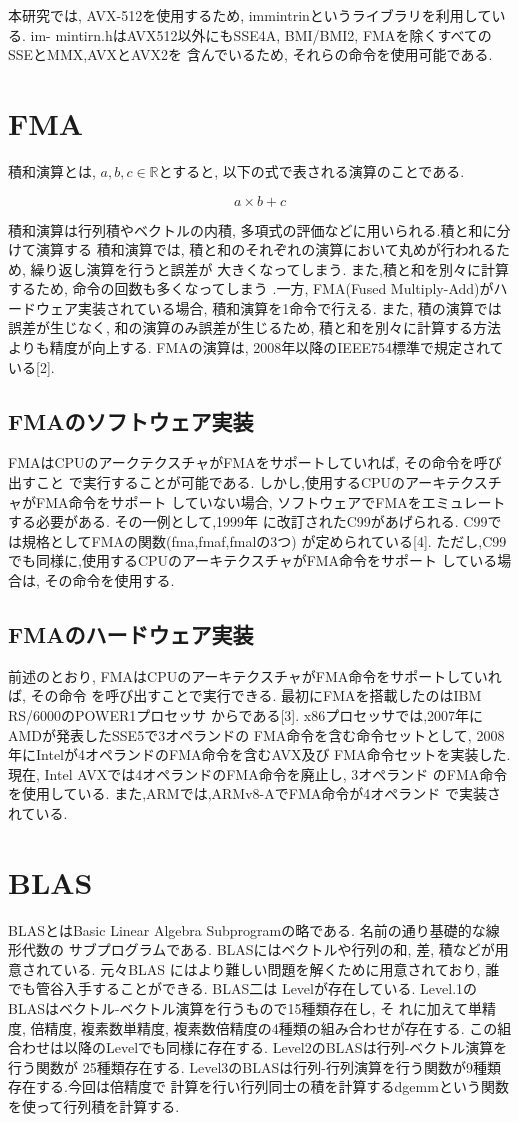 \documentclass[11pt,a4paper]{jsreport}
\theoremstyle{definition}
\begin{document}
  本研究では, AVX-512を使用するため, immintrinというライブラリを利用している. im-
mintirn.hはAVX512以外にもSSE4A, BMI/BMI2, FMAを除くすべてのSSEとMMX,AVXとAVX2を
含んでいるため, それらの命令を使用可能である.
\section{FMA}
  積和演算とは, $a,b,c \in \mathbb{R}$とすると, 以下の式で表される演算のことである.

  \begin{equation*}
  a \times b + c
  \end{equation*}

  積和演算は行列積やベクトルの内積, 多項式の評価などに用いられる.積と和に分けて演算する
積和演算では, 積と和のそれぞれの演算において丸めが行われるため, 繰り返し演算を行うと誤差が
大きくなってしまう. また,積と和を別々に計算するため, 命令の回数も多くなってしまう .一方, 
FMA(Fused Multiply-Add)がハードウェア実装されている場合, 積和演算を1命令で行える. 
また, 積の演算では誤差が生じなく, 和の演算のみ誤差が生じるため, 積と和を別々に計算する方法
よりも精度が向上する. FMAの演算は, 2008年以降のIEEE754標準で規定されている[2].
\subsection{FMAのソフトウェア実装}
  FMAはCPUのアークテクスチャがFMAをサポートしていれば, その命令を呼び出すこと
で実行することが可能である. しかし,使用するCPUのアーキテクスチャがFMA命令をサポート
していない場合, ソフトウェアでFMAをエミュレートする必要がある. その一例として,1999年
に改訂されたC99があげられる. C99では規格としてFMAの関数(fma,fmaf,fmalの3つ)
が定められている[4]. ただし,C99でも同様に,使用するCPUのアーキテクスチャがFMA命令をサポート
している場合は, その命令を使用する.
\subsection{FMAのハードウェア実装}
  前述のとおり, FMAはCPUのアーキテクスチャがFMA命令をサポートしていれば, その命令
を呼び出すことで実行できる. 最初にFMAを搭載したのはIBM RS/6000のPOWER1プロセッサ
からである[3]. x86プロセッサでは,2007年にAMDが発表したSSE5で3オペランドの
FMA命令を含む命令セットとして, 2008年にIntelが4オペランドのFMA命令を含むAVX及び
FMA命令セットを実装した. 現在, Intel AVXでは4オペランドのFMA命令を廃止し, 3オペランド
のFMA命令を使用している. また,ARMでは,ARMv8-AでFMA命令が4オペランド
で実装されている.
\section{BLAS}
  BLASとはBasic Linear Algebra Subprogramの略である. 名前の通り基礎的な線形代数の
サブプログラムである. BLASにはベクトルや行列の和, 差, 積などが用意されている. 元々BLAS
にはより難しい問題を解くために用意されており, 誰でも管谷入手することができる. BLAS二は
Levelが存在している. Level.1のBLASはベクトル-ベクトル演算を行うもので15種類存在し, そ
れに加えて単精度, 倍精度, 複素数単精度, 複素数倍精度の4種類の組み合わせが存在する. この組
合わせは以降のLevelでも同様に存在する. Level2のBLASは行列-ベクトル演算を行う関数が
25種類存在する. Level3のBLASは行列-行列演算を行う関数が9種類存在する.今回は倍精度で
計算を行い行列同士の積を計算するdgemmという関数を使って行列積を計算する.
\newpage
\end{document}
